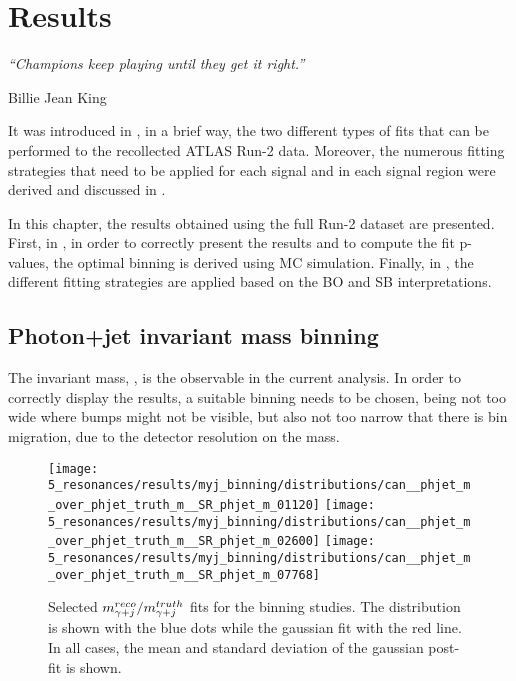 \chapter{Results}
\label{ch:results}
\epigraph{\emph{“Champions keep playing until they get it right.”}}{Billie Jean King}


It was introduced in \Sect{\ref{sec:strategy:strategy}}, in a brief way, the two different types of fits that can be performed to the recollected \ac{ATLAS} Run-2 data. Moreover, the numerous fitting strategies that need to be applied for each signal and in each signal region were derived and discussed in \Sect{\ref{sec:bkg:modeling}}.

In this chapter, the results obtained using the full Run-2 dataset are presented. First, in \Sect{\ref{sec:results:obs}}, in order to correctly present the results and to compute the fit p-values, the optimal binning is derived using \ac{MC} simulation. Finally, in \Sect{\ref{sec:results:results}}, the different fitting strategies are applied based on the \ac{BO} and \ac{SB} interpretations.






\section{Photon+jet invariant mass binning}
\label{sec:results:obs}


The \gammajet invariant mass, \myj, is the observable in the current analysis. In order to correctly display the results, a suitable binning needs to be chosen, being not too wide where bumps might not be visible, but also not too narrow that there is bin migration, due to the detector resolution on the mass.

\begin{figure}[ht!]
    \centering
    \texttt{[image: 5\_resonances/results/myj\_binning/distributions/can\_\_phjet\_m\_over\_phjet\_truth\_m\_\_SR\_phjet\_m\_01120]}
    \hfill
    \texttt{[image: 5\_resonances/results/myj\_binning/distributions/can\_\_phjet\_m\_over\_phjet\_truth\_m\_\_SR\_phjet\_m\_02600]}
    \hfill
    \texttt{[image: 5\_resonances/results/myj\_binning/distributions/can\_\_phjet\_m\_over\_phjet\_truth\_m\_\_SR\_phjet\_m\_07768]}
    \caption{Selected \(m_{\gamma+j}^{reco} / m_{\gamma+j}^{truth}\) fits for the \myj binning studies. The distribution is shown with the blue dots while the gaussian fit with the red line. In all cases, the mean and standard deviation of the gaussian post-fit is shown.}
    \label{fig:results:obs:ratio_fits}
\end{figure}

